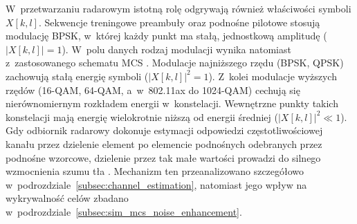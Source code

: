 W~przetwarzaniu radarowym istotną rolę odgrywają również właściwości symboli $X[k,l]$. Sekwencje treningowe preambuły oraz podnośne pilotowe stosują modulację BPSK, w~której każdy punkt ma stałą, jednostkową amplitudę ($|X[k,l]| = 1$). W~polu danych rodzaj modulacji wynika natomiast z~zastosowanego schematu MCS \cite{1999,2021}. Modulacje najniższego rzędu (BPSK, QPSK) zachowują stałą energię symboli ($|X[k,l]|^2 = 1$). Z~kolei modulacje wyższych rzędów (16-QAM, 64-QAM, a~w~802.11ax do 1024-QAM) cechują się nierównomiernym rozkładem energii w~konstelacji. Wewnętrzne punkty takich konstelacji mają energię wielokrotnie niższą od energii średniej ($|X[k,l]|^2 \ll 1$). Gdy odbiornik radarowy dokonuje estymacji odpowiedzi częstotliwościowej kanału przez dzielenie element po elemencie podnośnych odebranych przez podnośne wzorcowe, dzielenie przez tak małe wartości prowadzi do silnego wzmocnienia szumu tła \cite{braun2014,wypich2026}. Mechanizm ten przeanalizowano szczegółowo w~podrozdziale~\ref{subsec:channel_estimation}, natomiast jego wpływ na wykrywalność celów zbadano w~podrozdziale~\ref{subsec:sim_mcs_noise_enhancement}.
